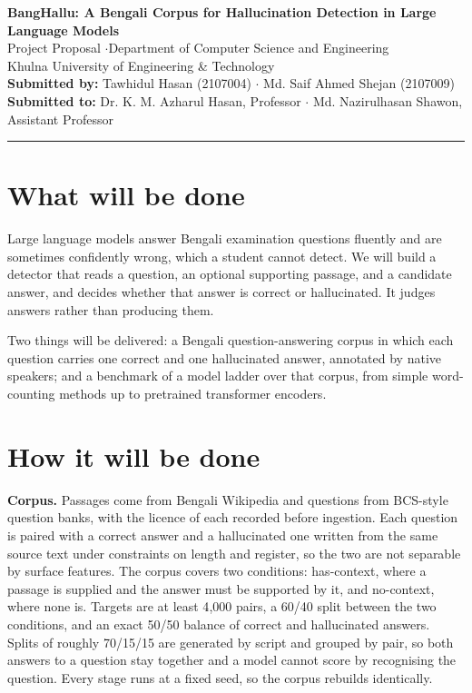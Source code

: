 \documentclass[11pt,a4paper]{article}
\begin{document}
\begin{center}
{\large\bfseries BangHallu: A Bengali Corpus for Hallucination Detection
in Large Language Models}\\[3pt]
{\small Project Proposal \quad$\cdot$\quad Department of Computer Science and
Engineering}\\
{\small Khulna University of Engineering \& Technology}\\[4pt]
{\small\textbf{Submitted by:} Tawhidul Hasan (2107004) \quad$\cdot$\quad
Md. Saif Ahmed Shejan (2107009)}\\
{\small\textbf{Submitted to:} Dr. K. M. Azharul Hasan, Professor \quad$\cdot$\quad
Md. Nazirulhasan Shawon, Assistant Professor}
\end{center}
\vspace{2pt}
\hrule
\vspace{4pt}

\section{What will be done}

Large language models answer Bengali examination questions fluently and are
sometimes confidently wrong, which a student cannot detect. We will build a
detector that reads a question, an optional supporting passage, and a candidate
answer, and decides whether that answer is correct or hallucinated. It judges
answers rather than producing them.

Two things will be delivered: a Bengali question-answering corpus in which each
question carries one correct and one hallucinated answer, annotated by native
speakers; and a benchmark of a model ladder over that corpus, from simple
word-counting methods up to pretrained transformer encoders.

\section{How it will be done}

\textbf{Corpus.} Passages come from Bengali Wikipedia and questions from
BCS-style question banks, with the licence of each recorded before ingestion.
Each question is paired with a correct answer and a hallucinated one written
from the same source text under constraints on length and register, so the two
are not separable by surface features. The corpus covers two conditions:
has-context, where a passage is supplied and the answer must be supported by it,
and no-context, where none is. Targets are at least 4{,}000 pairs, a 60/40
split between the two conditions, and an exact 50/50 balance of correct and
hallucinated answers. Splits of roughly 70/15/15 are generated by script and
grouped by pair, so both answers to a question stay together and a model cannot
score by recognising the question. Every stage runs at a fixed seed, so the
corpus rebuilds identically.
\end{document}
